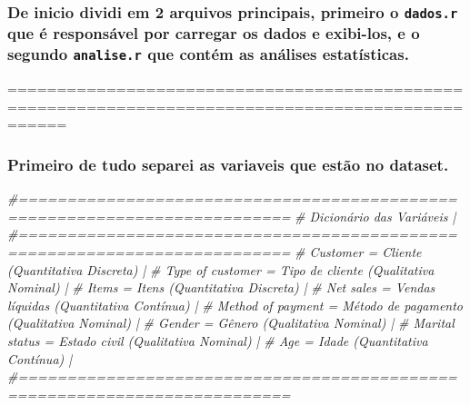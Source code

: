 \documentclass[
]{article}
\newenvironment{Shaded}{\begin{snugshade}}{\end{snugshade}}
\newcommand{\CommentTok}[1]{\textcolor[rgb]{0.56,0.35,0.01}{\textit{#1}}}
\begin{document}
\subsubsection{\texorpdfstring{De inicio dividi em 2 arquivos
principais, primeiro o \texttt{dados.r} que é responsável por carregar
os dados e exibi-los, e o segundo \texttt{analise.r} que contém as
análises
estatísticas.}{De inicio dividi em 2 arquivos principais, primeiro o dados.r que é responsável por carregar os dados e exibi-los, e o segundo analise.r que contém as análises estatísticas.}}\label{de-inicio-dividi-em-2-arquivos-principais-primeiro-o-dados.r-que-uxe9-responsuxe1vel-por-carregar-os-dados-e-exibi-los-e-o-segundo-analise.r-que-contuxe9m-as-anuxe1lises-estatuxedsticas.}

==================================================================================================

\subsubsection{Primeiro de tudo separei as variaveis que estão no
dataset.}\label{primeiro-de-tudo-separei-as-variaveis-que-estuxe3o-no-dataset.}

\begin{Shaded}
\begin{Highlighting}[]
\CommentTok{\#==========================================================================}
\CommentTok{\# Dicionário das Variáveis                                                |           }
\CommentTok{\#==========================================================================}
\CommentTok{\# Customer            = Cliente                  (Quantitativa Discreta)  |}
\CommentTok{\# Type of customer    = Tipo de cliente          (Qualitativa Nominal)    |}
\CommentTok{\# Items               = Itens                    (Quantitativa Discreta)  |}
\CommentTok{\# Net sales           = Vendas líquidas          (Quantitativa Contínua)  |}
\CommentTok{\# Method of payment   = Método de pagamento      (Qualitativa Nominal)    |}
\CommentTok{\# Gender              = Gênero                   (Qualitativa Nominal)    |}
\CommentTok{\# Marital status      = Estado civil             (Qualitativa Nominal)    |}
\CommentTok{\# Age                 = Idade                    (Quantitativa Contínua)  |}
\CommentTok{\#==========================================================================}
\end{Highlighting}
\end{Shaded}
\end{document}

